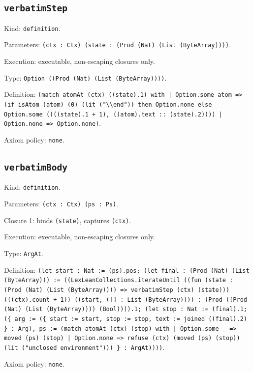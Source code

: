 \documentclass[11pt]{article}
\begin{document}
\subsection*{\texttt{verbatimStep}}
\noindent Kind: \texttt{definition}.\par
\noindent Parameters: \texttt{(ctx : Ctx) (state : (Prod (Nat) (List (ByteArray))))}.\par
\noindent Execution: executable, non-escaping closures only.\par
\noindent Type: \texttt{Option ((Prod (Nat) (List (ByteArray))))}.\par
\noindent Definition: \texttt{(match atomAt (ctx) ((state).1) with | Option.some atom => (if isAtom (atom) (0) (lit ("\textbackslash{}\textbackslash{}end")) then Option.none else Option.some ((((state).1 + 1), ((atom).text :: (state).2)))) | Option.none => Option.none)}.\par
\noindent Axiom policy: \texttt{none}.\par
\subsection*{\texttt{verbatimBody}}
\noindent Kind: \texttt{definition}.\par
\noindent Parameters: \texttt{(ctx : Ctx) (ps : Ps)}.\par
\noindent Closure 1: binds \texttt{(state)}, captures \texttt{(ctx)}.\par
\noindent Execution: executable, non-escaping closures only.\par
\noindent Type: \texttt{ArgAt}.\par
\noindent Definition: \texttt{(let start : Nat := (ps).pos; (let final : (Prod (Nat) (List (ByteArray))) := ((LexLeanCollections.iterateUntil ((fun (state : (Prod (Nat) (List (ByteArray)))) => verbatimStep (ctx) (state))) (((ctx).count + 1)) ((start, ([] : List (ByteArray)))) : (Prod ((Prod (Nat) (List (ByteArray)))) (Bool)))).1; (let stop : Nat := (final).1; (\{ arg := (\{ start := start, stop := stop, text := joined ((final).2) \} : Arg), ps := (match atomAt (ctx) (stop) with | Option.some \_ => moved (ps) (stop) | Option.none => refuse (ctx) (moved (ps) (stop)) (lit ("unclosed environment"))) \} : ArgAt))))}.\par
\noindent Axiom policy: \texttt{none}.\par
\end{document}
